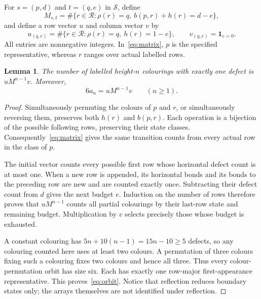 \documentclass[11pt,a4paper]{article}
\newtheorem{lemma}[theorem]{Lemma}
\newcommand{\ind}{\mathbf 1}
\begin{document}
For $s=(p,d)$ and $t=(q,e)$ in $\mathcal S$, define
\begin{equation}\label{eq:matrix}
 M_{s,t}=\#\{r\in\mathcal R:\rho(r)=q,
                   \ b(p,r)+h(r)=d-e\},
\end{equation}
and define a row vector $u$ and column vector $v$ by
\begin{equation}\label{eq:boundary}
 u_{(q,e)}=\#\{r\in\mathcal R:\rho(r)=q,\ h(r)=1-e\},
 \qquad v_{(q,e)}=\ind_{e=0}.
\end{equation}
All entries are nonnegative integers. In~\eqref{eq:matrix}, $p$ is the
specified representative, whereas $r$ ranges over actual labelled rows.

\begin{lemma}\label{lem:transfer}
The number of labelled height-$n$ colourings with exactly one defect is
$uM^{n-1}v$. Moreover,
\begin{equation}\label{eq:orbit}
 6a_n=uM^{n-1}v\qquad(n\geq1).
\end{equation}
\end{lemma}
\begin{proof}
Simultaneously permuting the colours of $p$ and $r$, or simultaneously
reversing them, preserves both $h(r)$ and $b(p,r)$. Each operation is a
bijection of the possible following rows, preserving their state classes.
Consequently~\eqref{eq:matrix} gives the same transition counts from every
actual row in the class of $p$.

The initial vector counts every possible first row whose horizontal
defect count is at most one. When a new row is appended, its horizontal
bonds and its bonds to the preceding row are new and are counted exactly
once. Subtracting their defect count from $d$ gives the next budget $e$.
Induction on the number of rows therefore proves that $uM^{n-1}$ counts
all partial colourings by their last-row state and remaining budget.
Multiplication by $v$ selects precisely those whose budget is exhausted.

A constant colouring has $5n+10(n-1)=15n-10\geq5$ defects, so any
colouring counted here uses at least two colours. A permutation of three
colours fixing such a colouring fixes two colours and hence all three.
Thus every colour-permutation orbit has size six. Each has exactly one
row-major first-appearance representative. This proves~\eqref{eq:orbit}.
Notice that reflection reduces boundary states only; the arrays themselves
are not identified under reflection.
\end{proof}
\end{document}
